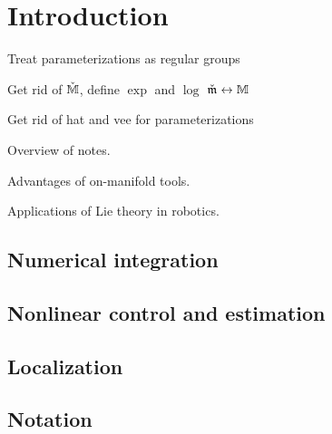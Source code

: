 
\chapter{Introduction}

\begin{itemize_outcomes}
  \item Treat parameterizations as regular groups
  \item Get rid of $\check{\mathbb{M}}$, define $\exp$ and $\log$ $\check{\mathfrak{m}} \leftrightarrow \mathbb{M}$
  \item Get rid of hat and vee for parameterizations
  \item Overview of notes.
  \item Advantages of on-manifold tools.
  \item Applications of Lie theory in robotics.
\end{itemize_outcomes}


\section{Numerical integration}


\section{Nonlinear control and estimation}


\section{Localization}


\section{Notation}

